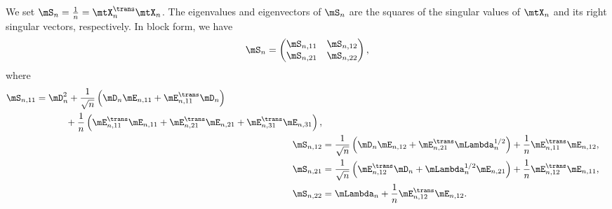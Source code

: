 We set $\mS_n = \frac{1}{n} = \mtX_n^\trans \mtX_n$.  The eigenvalues and eigenvectors of $\mS_n$ are the squares of the singular values of $\mtX_n$ and its right singular vectors, respectively.  In block form, we have
\[
    \mS_n
    =
    \left(
    \begin{matrix}
        \mS_{n,11} & \mS_{n,12} \\
        \mS_{n,21} & \mS_{n,22}
    \end{matrix}
    \right),
\]
where
\begin{align*}
    \begin{split}
    \mS_{n,11}
        &=
            \mD_n^2 
            + 
            \frac{1}{\sqrt{n}} 
            \left( 
                \mD_n \mE_{n,11} + \mE_{n,11}^\trans \mD_n
            \right) \\
            &\phantom{= \mD_n^2} +
            \frac{1}{n}
            \left(
                \mE_{n,11}^\trans \mE_{n,11}
                +
                \mE_{n,21}^\trans \mE_{n,21}
                +
                \mE_{n,31}^\trans \mE_{n,31}
            \right),
    \end{split} \\
    \mS_{n,12}
        &=
            \frac{1}{\sqrt{n}}
            \left(
                \mD_n \mE_{n,12} + \mE_{n,21}^\trans \mLambda_n^{1/2}
            \right)
            +
            \frac{1}{n}
            \mE_{n,11}^\trans \mE_{n,12}, \\
    \mS_{n,21}
        &=
            \frac{1}{\sqrt{n}}
            \left(
                \mE_{n,12}^\trans \mD_n
                +
                \mLambda_n^{1/2} \mE_{n,21}
            \right)
            +
            \frac{1}{n}
            \mE_{n,12}^\trans \mE_{n,11}, \\
    \mS_{n,22}
        &=
            \mLambda_n
            +
            \frac{1}{n}
            \mE_{n,12}^\trans \mE_{n,12}.
\end{align*}

